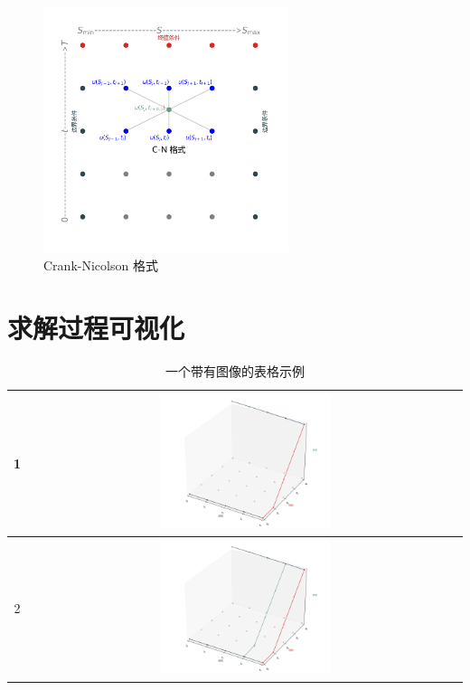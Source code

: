 \documentclass{article}
\begin{document}
\begin{figure}[H]
  \centering
  \includegraphics[width=0.64\textwidth,height=0.64\textwidth]{Images/4_CNEu.png}
  \caption{Crank-Nicolson 格式}
  \label{fig:4_CNEu}
\end{figure} 


\section{求解过程可视化}


\begin{table}[h!]
\centering
\begin{tabular}{|c|c|}
\hline
1 & \includegraphics[width=0.4\textwidth]{Images/5_option_price_surface_4iter_step0.png} \\
\hline
2 & \includegraphics[width=0.4\textwidth]{Images/6_option_price_surface_4iter_step1.png} \\
\hline
\end{tabular}
\caption{一个带有图像的表格示例}
\label{table:example}
\end{table}
\end{document}
